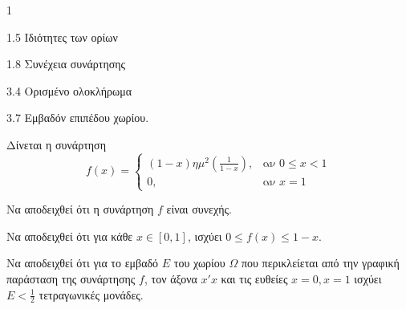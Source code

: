 \begin{ylh}{1}
    \item 1.5 Ιδιότητες των ορίων
    \item 1.8 Συνέχεια συνάρτησης
    \item 3.4 Ορισμένο ολοκλήρωμα
    \item 3.7 Εμβαδόν επιπέδου χωρίου.
\end{ylh}
Δίνεται η συνάρτηση
\[
f(x) = \begin{cases}
    (1-x)\eta\mu^2\left(\frac{1}{1-x}\right), & \text{αν } 0 \le x < 1 \\
    0, & \text{αν } x = 1
\end{cases}
\]
\begin{alist}
\item Να αποδειχθεί ότι η συνάρτηση $f$ είναι συνεχής. 
\item Να αποδειχθεί ότι για κάθε $x \in [0,1]$, ισχύει $0 \le f(x) \le 1-x$. 
\item Να αποδειχθεί ότι για το εμβαδό $E$ του χωρίου $\Omega$ που περικλείεται από την γραφική παράσταση της συνάρτησης $f$, τον άξονα $x'x$ και τις ευθείες $x=0, x=1$ ισχύει $E < \frac{1}{2}$ τετραγωνικές μονάδες. 
\end{alist}